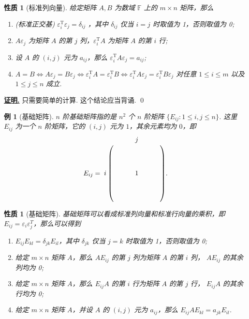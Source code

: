 \documentclass[10pt,openany]{article}
\theoremstyle{thmstyle} %
\theoremstyle{defstyle} %
\theoremstyle{prostyle} %
\newtheorem{property}[theorem]{性质}
\theoremstyle{exastyle}
\newtheorem{example}[theorem]{例}
\theoremstyle{remstyle}
\renewenvironment{proof}[1][证明]{\par\underline{\textbf{#1.}} \;\fangsong}{\qed\par}
\newcommand{\T}{^{\text{T}}}
\newcommand{\F}{\mathbb{F}}
\begin{document}
\begin{property}[标准列向量]	\label{1.3.14}
	给定矩阵 \( A,B \) 为数域 \( \F \) 上的 \( m \times n \) 矩阵，那么
	\begin{enumerate}[(1)]
		\item(标准正交基) \( \varepsilon_i\T\varepsilon_j = \delta_{ij} \) ，其中 \( \delta_{ij} \) 仅当 \( i=j \) 时取值为 1，否则取值为 0;
		\item \( A\varepsilon_j \) 为矩阵 \( A \) 的第 \( j \) 列，\( \varepsilon_i\T A \) 为矩阵 \( A \) 的第 \( i \) 行;
		\item 设 \( A \) 的 \( (i,j) \) 元为 \( a_{ij} \)，那么 \( \varepsilon_i\T A\varepsilon_j =a_{ij} \);
		\item \( A=B \Leftrightarrow A\varepsilon_j = B\varepsilon_j \Leftrightarrow \varepsilon_i\T A = \varepsilon_i\T B \Leftrightarrow \varepsilon_i\T A\varepsilon_j = \varepsilon_i\T B\varepsilon_j  \) 对任意 \( 1 \leq i \leq m \) 以及 \( 1 \leq j \leq n \) 成立.
	\end{enumerate} 

\end{property}

\begin{proof}
	只需要简单的计算. 这个结论应当背诵.
\end{proof}

\begin{example}[基础矩阵]
	\( n \) 阶基础矩阵指的是 \( n^2 \) 个 \( n \) 阶矩阵 \( \{E_{ij}:1 \leq i,j \leq n\} \). 这里 \( E_{ij} \) 为一个 \( n \) 阶矩阵，它的 \( (i,j) \) 元为 \( 1 \)，其余元素均为 \( 0 \)，即
	\[ E_{ij}=\bordermatrix{
		& & & & \textbf{\(j\)} & & &  \cr
		&  & & & &  & &  \cr
		& &  & & &  & &  \cr
		& & &  & &  & &  \cr
		\textbf{\(i\)}	& & & & 1 & & &   \cr
		& &  & & &   & &  \cr
		& & & &  & & &  \cr
		& & & & & & &   
	}. \]
\end{example}

\begin{property}[基础矩阵]	\label{1.3.16}
	基础矩阵可以看成标准列向量和标准行向量的乘积，即 \( E_{ij}=\varepsilon_i\varepsilon_j^{T} \)，那么可以得到
	\begin{enumerate}[(1)]
		\item \( E_{ij}E_{kl}=\delta_{jk}E_{il} \)，其中 \( \delta_{jk} \) 仅当 \( j=k \) 时取值为 1，否则取值为 0;
		\item 给定 \( m \times n \) 矩阵 \( A \)，那么 \( AE_{ij} \) 的第 \( j \) 列为矩阵 \( A \) 的第 \( i \) 列， \( AE_{ij} \) 的其余列均为 0;
		\item 给定 \( m \times n \) 矩阵 \( A \)，那么 \( E_{ij}A \) 的第 \( i \) 行为矩阵 \( A \) 的第 \( j \) 行， \( E_{ij}A \) 的其余行均为 0;
		\item 给定 \( m \times n \) 矩阵 \( A \)，并设 \( A \) 的 \( (i,j) \) 元为 \( a_{ij} \)，那么 \( E_{ij}AE_{kl} =a_{jk}E_{il} \).
	\end{enumerate}

\end{property}
\end{document}
